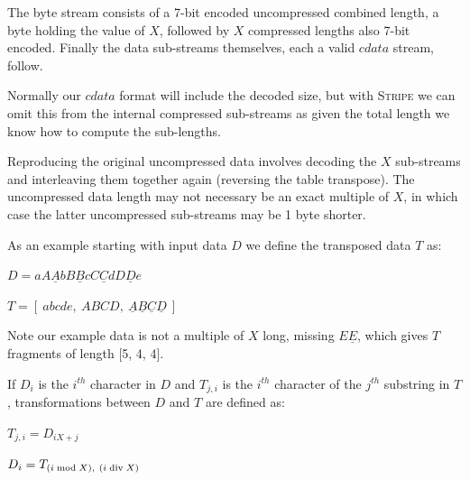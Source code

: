 \documentclass[a4paper]{article}
\begin{document}
The byte stream consists of a 7-bit encoded uncompressed combined
length, a byte holding the value of $X$, followed by $X$ compressed
lengths also 7-bit encoded.  Finally the data sub-streams themselves,
each a valid $cdata$ stream, follow.

Normally our $cdata$ format will include the decoded size, but with
\textsc{Stripe} we can omit this from the internal compressed sub-streams
as given the total length we know how to compute the sub-lengths.

Reproducing the original uncompressed data involves decoding the $X$
sub-streams and interleaving them together again (reversing the table
transpose).  The uncompressed data length may not necessary be an exact
multiple of $X$, in which case the latter uncompressed sub-streams may
be 1 byte shorter.

As an example starting with input data $D$ we define the transposed data $T$ as:

\hspace{1cm}
$D = aA\underline{A}bB\underline{B}cC\underline{C}dD\underline{D}e$

\hspace{1cm}
$T = [\ abcde,\ ABCD,\ \underline{A}\underline{B}\underline{C}\underline{D}\ ]$

Note our example data is not a multiple of $X$ long, missing
$E\underline{E}$, which gives $T$ fragments of length [5, 4, 4].

If $D_i$ is the $i^{th}$ character in $D$ and $T_{j,i}$ is the
$i^{th}$ character of the $j^{th}$ substring in $T$, transformations
between $D$ and $T$ are defined as:

\hspace{1cm}
$T_{j,i} = D_{i X +j}$

\hspace{1cm}
$D_i = T_{(i \bmod X),\ (i \bdiv X)}$


\end{document}
